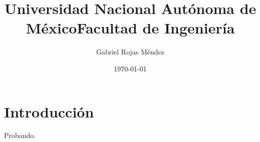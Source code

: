 \documentclass[12pt]{article}
\title{Universidad Nacional Autónoma de México}
\title{Facultad de Ingeniería}
\author{Gabriel Rojas Méndez}
\date{\today}
\begin{document}
	
	\maketitle
	
	\thispagestyle{fancy}
	
	\section{Introducción}
	Probando.
	
\end{document}

